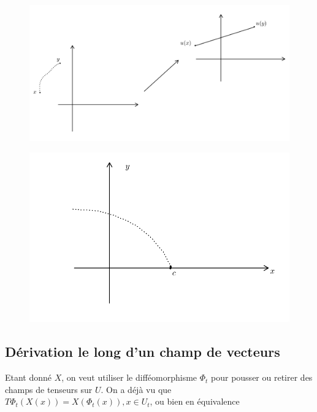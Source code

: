 \documentclass[french]{article}
\theoremstyle{definition}
\begin{document}

\begin{figure}[h!]
  \centering
  \includegraphics[scale=0.3]{figures/fig10.png}
  \caption{}
  \label{}
\end{figure}


\begin{figure}[h!]
  \centering
  \includegraphics[scale=0.3]{figures/fig11.png}
  \caption{}
  \label{}
\end{figure}


\subsection{D\'erivation le long d'un champ de vecteurs}

Etant donné \(X\), on veut utiliser le difféomorphisme \(\Phi_t\) pour pousser ou retirer des champs de tenseurs sur \(U\). On a déjà vu que \(T \Phi_t(X(x))  = X(\Phi_t(x)), x \in U_t\),  ou bien en \'equivalence
\end{document}
